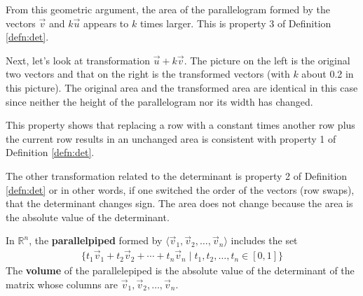 From this geometric argument, the area of the parallelogram formed by the vectors $\vec{v}$ and $k\vec{u}$ appears to $k$ times larger.  This is property 3 of Definition \ref{defn:det}.


Next, let's look at transformation $\vec{u} + k\vec{v}$.  The picture on the left is the original two vectors and that on the right is the transformed vectors (with $k$ about 0.2 in this picture).  The original area and the transformed area are identical in this case since neither the height of the parallelogram nor its width has changed.

\begin{center}
\end{center}

This property shows that replacing a row with a constant times another row plus the current row results in an unchanged area is consistent with property 1 of Definition \ref{defn:det}.


The other transformation related to the determinant is property 2 of Definition \ref{defn:det} or in other words,  if one switched the order of the vectors (row swaps), that the determinant changes sign.  The area does not change because the area is the absolute value of the determinant.



\begin{definition}
In $\mathbb{R}^n$, the \textbf{parallelpiped} formed by $\langle \vec{v}_1, \vec{v}_2, \ldots, \vec{v}_n \rangle$ includes the set
%
\begin{align*}
\{ t_1 \vec{v}_1 + t_2 \vec{v}_2 + \cdots + t_n \vec{v}_n\; | \; t_1, t_2, \ldots, t_n \in [0,1] \}
\end{align*}
The \textbf{volume} of the parallelepiped is the absolute value of the determinant of the matrix whose columns are $\vec{v}_1, \vec{v}_2, \ldots, \vec{v}_n$.
\end{definition}

